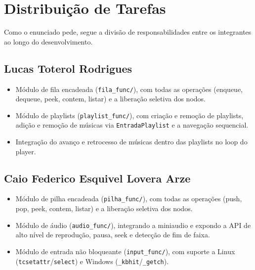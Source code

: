 \documentclass[
    12pt
    ,oneside
    ,a4paper
    ,chapter=TITLE
    ,section=TITLE
    ,sumario=abnt-6027-2012]{abntex2}
\begin{document}
\chapter{Distribuição de Tarefas}
\label{cap:distribuicao}

Como o enunciado pede, segue a divisão de responsabilidades entre os integrantes ao longo do desenvolvimento.

\section*{Lucas Toterol Rodrigues}
\begin{itemize}
    \item Módulo de fila encadeada (\texttt{fila\_func/}), com todas as operações (enqueue, dequeue, peek, contem, listar) e a liberação seletiva dos nodos.
    \item Módulo de playlists (\texttt{playlist\_func/}), com criação e remoção de playlists, adição e remoção de músicas via \texttt{EntradaPlaylist} e a navegação sequencial.
    \item Integração do avanço e retrocesso de músicas dentro das playlists no loop do player.
\end{itemize}

\section*{Caio Federico Esquivel Lovera Arze}
\begin{itemize}
    \item Módulo de pilha encadeada (\texttt{pilha\_func/}), com todas as operações (push, pop, peek, contem, listar) e a liberação seletiva dos nodos.
    \item Módulo de áudio (\texttt{audio\_func/}), integrando a miniaudio e expondo a API de alto nível de reprodução, pausa, seek e detecção de fim de faixa.
    \item Módulo de entrada não bloqueante (\texttt{input\_func/}), com suporte a Linux (\texttt{tcsetattr}/\texttt{select}) e Windows (\texttt{\_kbhit}/\texttt{\_getch}).
\end{itemize}
\end{document}
